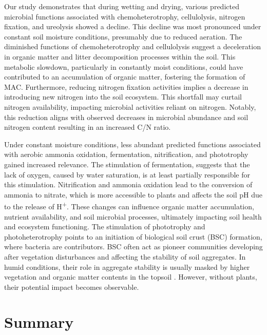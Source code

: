 Our study demonstrates that during wetting and drying, various predicted microbial functions associated with chemoheterotrophy, cellulolysis, nitrogen fixation, and ureolysis showed a decline. This decline was most pronounced under constant soil moisture conditions, presumably due to reduced aeration. The diminished functions of chemoheterotrophy and cellulolysis suggest a deceleration in organic matter and litter decomposition processes within the soil. This metabolic slowdown, particularly in constantly moist conditions, could have contributed to an accumulation of organic matter, fostering the formation of MAC. Furthermore, reducing nitrogen fixation activities implies a decrease in introducing new nitrogen into the soil ecosystem. This shortfall may curtail nitrogen availability, impacting microbial activities reliant on nitrogen. Notably, this reduction aligns with observed decreases in microbial abundance and soil nitrogen content resulting in an increased C/N ratio.

Under constant moisture conditions, less abundant predicted functions associated with aerobic ammonia oxidation, fermentation, nitrification, and phototrophy gained increased relevance. The stimulation of fermentation, suggests that the lack of oxygen, caused by water saturation, is at least partially responsible for this stimulation. Nitrification and ammonia oxidation lead to the conversion of ammonia to nitrate, which is more accessible to plants and affects the soil pH due to the release of H\textsuperscript{+}. These changes can influence organic matter accumulation, nutrient availability, and soil microbial processes, ultimately impacting soil health and ecosystem functioning. The stimulation of phototrophy and photoheterotrophy points to an initiation of biological soil crust (BSC) formation, where bacteria are contributors. BSC often act as pioneer communities developing after vegetation disturbances and affecting the stability of soil aggregates. In humid conditions, their role in aggregate stability is usually masked by higher vegetation and organic matter contents in the topsoil \citep{RiverasMunoz2022}. However, without plants, their potential impact becomes observable.

\section{Summary}

